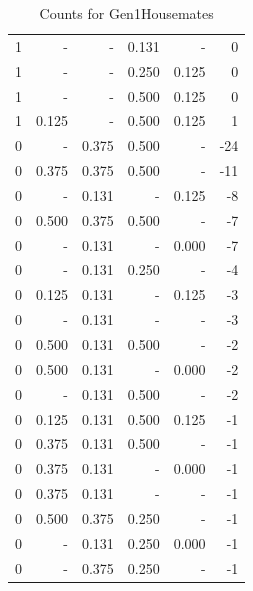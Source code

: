 \documentclass[a4paper]{article}\usepackage{graphicx, color}
\begin{document}
\begin{table}[ht]
\begin{tabular}{rrrrrr}
   \rowcolor{sosoColor} 1 & - & - & 0.131 & - & 0 \\ 
   \rowcolor{sosoColor} 1 & - & - & 0.250 & 0.125 & 0 \\ 
   \rowcolor{sosoColor} 1 & - & - & 0.500 & 0.125 & 0 \\ 
   \rowcolor{sosoColor} 1 & 0.125 & - & 0.500 & 0.125 & 1 \\ 
   \rowcolor{sosoColor} 0 & - & 0.375 & 0.500 & - & -24 \\ 
   \rowcolor{sosoColor} 0 & 0.375 & 0.375 & 0.500 & - & -11 \\ 
  0 & - & 0.131 & - & 0.125 & -8 \\ 
   \rowcolor{sosoColor} 0 & 0.500 & 0.375 & 0.500 & - & -7 \\ 
  0 & - & 0.131 & - & 0.000 & -7 \\ 
  0 & - & 0.131 & 0.250 & - & -4 \\ 
  0 & 0.125 & 0.131 & - & 0.125 & -3 \\ 
  0 & - & 0.131 & - & - & -3 \\ 
   \rowcolor{badColor} 0 & 0.500 & 0.131 & 0.500 & - & -2 \\ 
  0 & 0.500 & 0.131 & - & 0.000 & -2 \\ 
   \rowcolor{badColor} 0 & - & 0.131 & 0.500 & - & -2 \\ 
   \rowcolor{badColor} 0 & 0.125 & 0.131 & 0.500 & 0.125 & -1 \\ 
   \rowcolor{badColor} 0 & 0.375 & 0.131 & 0.500 & - & -1 \\ 
  0 & 0.375 & 0.131 & - & 0.000 & -1 \\ 
  0 & 0.375 & 0.131 & - & - & -1 \\ 
   \rowcolor{sosoColor} 0 & 0.500 & 0.375 & 0.250 & - & -1 \\ 
  0 & - & 0.131 & 0.250 & 0.000 & -1 \\ 
   \rowcolor{sosoColor} 0 & - & 0.375 & 0.250 & - & -1 \\ 
   \hline
\end{tabular}
\caption{Counts for Gen1Housemates} 
\end{table}
\end{document}
